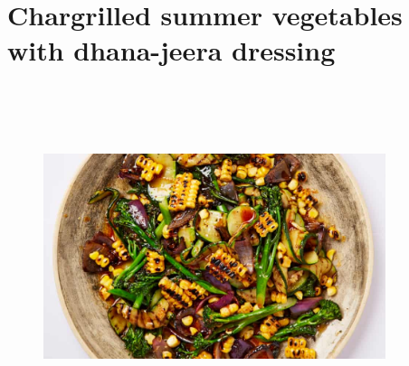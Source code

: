 \documentclass{book}
\begin{document}
\section{Chargrilled summer vegetables with dhana-jeera dressing}
\begin{figure}
\centering\includegraphics[width=10cm,height=10cm,keepaspectratio]{Recipe_Pictures/Chargrilled_summer_vegetables_with_dhana-jeera_dressing.png}
\end{figure}
\end{document}
